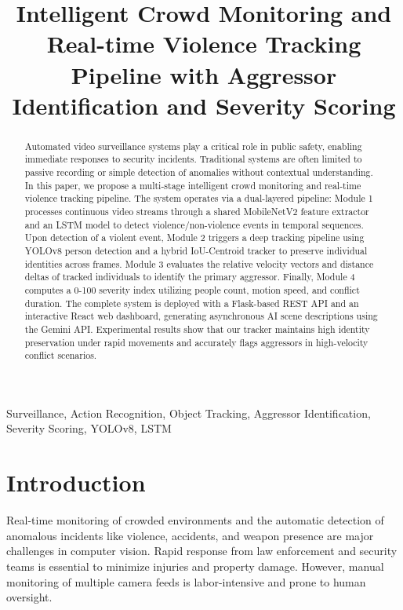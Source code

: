 \documentclass[conference]{IEEEtran}
\begin{document}
\title{Intelligent Crowd Monitoring and Real-time Violence Tracking Pipeline with Aggressor Identification and Severity Scoring}

\author{
}

\maketitle

\begin{abstract}
Automated video surveillance systems play a critical role in public safety, enabling immediate responses to security incidents. Traditional systems are often limited to passive recording or simple detection of anomalies without contextual understanding. In this paper, we propose a multi-stage intelligent crowd monitoring and real-time violence tracking pipeline. The system operates via a dual-layered pipeline: Module 1 processes continuous video streams through a shared MobileNetV2 feature extractor and an LSTM model to detect violence/non-violence events in temporal sequences. Upon detection of a violent event, Module 2 triggers a deep tracking pipeline using YOLOv8 person detection and a hybrid IoU-Centroid tracker to preserve individual identities across frames. Module 3 evaluates the relative velocity vectors and distance deltas of tracked individuals to identify the primary aggressor. Finally, Module 4 computes a 0-100 severity index utilizing people count, motion speed, and conflict duration. The complete system is deployed with a Flask-based REST API and an interactive React web dashboard, generating asynchronous AI scene descriptions using the Gemini API. Experimental results show that our tracker maintains high identity preservation under rapid movements and accurately flags aggressors in high-velocity conflict scenarios.
\end{abstract}

\begin{IEEEkeywords}
Surveillance, Action Recognition, Object Tracking, Aggressor Identification, Severity Scoring, YOLOv8, LSTM
\end{IEEEkeywords}

\section{Introduction}
Real-time monitoring of crowded environments and the automatic detection of anomalous incidents like violence, accidents, and weapon presence are major challenges in computer vision. Rapid response from law enforcement and security teams is essential to minimize injuries and property damage. However, manual monitoring of multiple camera feeds is labor-intensive and prone to human oversight.
\end{document}
